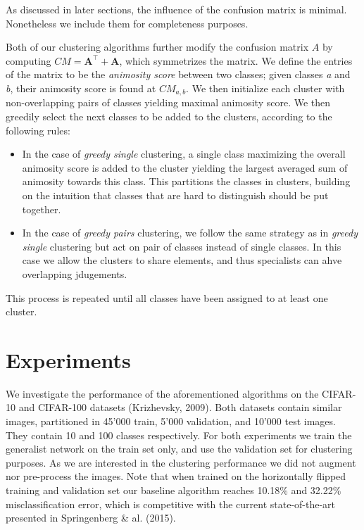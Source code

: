 \documentclass[12pt]{article}
\begin{document}
As discussed in later sections, the influence of the confusion matrix is
minimal. Nonetheless we include them for completeness purposes.

Both of our clustering algorithms further modify the confusion matrix
$A$ by computing $CM = \textbf{A}^\top + \textbf{A}$, which symmetrizes
the matrix. We define the entries of the matrix to be the
\emph{animosity score} between two classes; given classes \emph{a} and
\emph{b}, their animosity score is found at $CM_{a, b}$. We then
initialize each cluster with non-overlapping pairs of classes yielding
maximal animosity score. We then greedily select the next classes to be
added to the clusters, according to the following rules:

\begin{itemize}
\item
  In the case of \emph{greedy single} clustering, a single class
  maximizing the overall animosity score is added to the cluster
  yielding the largest averaged sum of animosity towards this class.
  This partitions the classes in clusters, building on the intuition
  that classes that are hard to distinguish should be put together.
\item
  In the case of \emph{greedy pairs} clustering, we follow the same
  strategy as in \emph{greedy single} clustering but act on pair of
  classes instead of single classes. In this case we allow the clusters
  to share elements, and thus specialists can ahve overlapping
  jdugements.
\end{itemize}

This process is repeated until all classes have been assigned to at
least one cluster.

\section{Experiments}\label{experiments}

We investigate the performance of the aforementioned algorithms on the
CIFAR-10 and CIFAR-100 datasets (Krizhevsky, 2009). Both datasets
contain similar images, partitioned in 45'000 train, 5'000 validation,
and 10'000 test images. They contain 10 and 100 classes respectively.
For both experiments we train the generalist network on the train set
only, and use the validation set for clustering purposes. As we are
interested in the clustering performance we did not augment nor
pre-process the images. Note that when trained on the horizontally
flipped training and validation set our baseline algorithm reaches
10.18\% and 32.22\% misclassification error, which is competitive with
the current state-of-the-art presented in Springenberg \& al. (2015).
\end{document}
